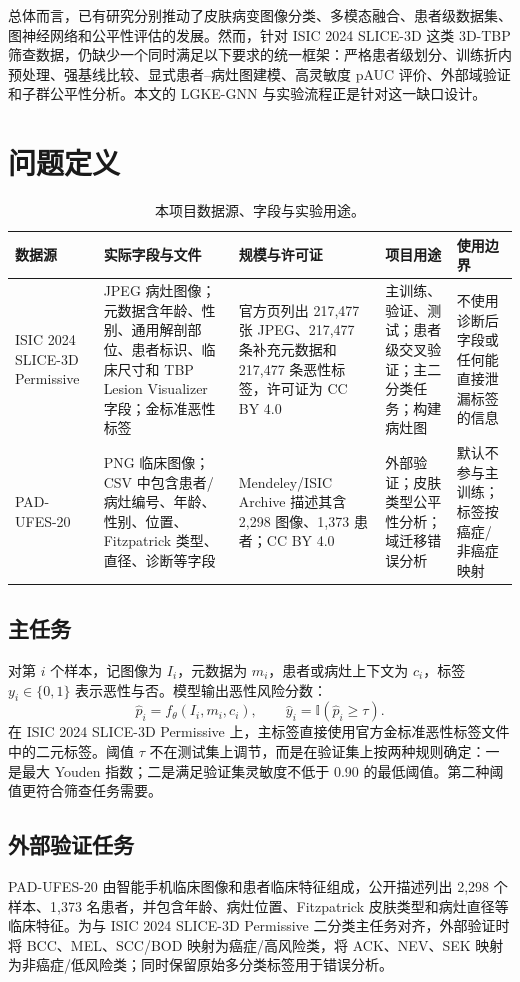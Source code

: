 \documentclass[UTF8,a4paper,10pt,twocolumn,fontset=fandol]{ctexart}
\newcommand{\isic}{ISIC 2024 SLICE-3D Permissive}
\newcommand{\pad}{PAD-UFES-20}
\begin{document}
总体而言，已有研究分别推动了皮肤病变图像分类、多模态融合、患者级数据集、图神经网络和公平性评估的发展。然而，针对 ISIC 2024 SLICE-3D 这类 3D-TBP 筛查数据，仍缺少一个同时满足以下要求的统一框架：严格患者级划分、训练折内预处理、强基线比较、显式患者--病灶图建模、高灵敏度 pAUC 评价、外部域验证和子群公平性分析。本文的 LGKE-GNN 与实验流程正是针对这一缺口设计。

\section{问题定义}
\begin{table}[t]
\centering
\small
\caption{本项目数据源、字段与实验用途。}
\label{tab:datasets}
\begin{tabularx}{\textwidth}{L{2.2cm}Y Y Y L{1.8cm}}
\toprule
数据源 & 实际字段与文件 & 规模与许可证 & 项目用途 & 使用边界 \\
\midrule
\isic{} & JPEG 病灶图像；元数据含年龄、性别、通用解剖部位、患者标识、临床尺寸和 TBP Lesion Visualizer 字段；金标准恶性标签 & 官方页列出 217,477 张 JPEG、217,477 条补充元数据和 217,477 条恶性标签，许可证为 CC BY 4.0\cite{isicdata2024} & 主训练、验证、测试；患者级交叉验证；主二分类任务；构建病灶图 & 不使用诊断后字段或任何能直接泄漏标签的信息 \\
\pad{} & PNG 临床图像；CSV 中包含患者/病灶编号、年龄、性别、位置、Fitzpatrick 类型、直径、诊断等字段 & Mendeley/ISIC Archive 描述其含 2,298 图像、1,373 患者；CC BY 4.0\cite{pacheco2020padufes20data,isicpadcollection} & 外部验证；皮肤类型公平性分析；域迁移错误分析 & 默认不参与主训练；标签按癌症/非癌症映射 \\
\bottomrule
\end{tabularx}
\end{table}
\subsection{主任务}
对第 $i$ 个样本，记图像为 $I_i$，元数据为 $m_i$，患者或病灶上下文为 $c_i$，标签 $y_i\in\{0,1\}$ 表示恶性与否。模型输出恶性风险分数：
\begin{equation}
    \hat{p}_i = f_{\theta}(I_i,m_i,c_i), \qquad
    \hat{y}_i = \mathbb{I}(\hat{p}_i \geq \tau).
\end{equation}
在 \isic{} 上，主标签直接使用官方金标准恶性标签文件中的二元标签。阈值 $\tau$ 不在测试集上调节，而是在验证集上按两种规则确定：一是最大 Youden 指数；二是满足验证集灵敏度不低于 0.90 的最低阈值。第二种阈值更符合筛查任务需要。

\subsection{外部验证任务}
\pad{} 由智能手机临床图像和患者临床特征组成，公开描述列出 2,298 个样本、1,373 名患者，并包含年龄、病灶位置、Fitzpatrick 皮肤类型和病灶直径等临床特征\cite{pacheco2020padufes20data,pacheco2020padufes20}。为与 \isic{} 二分类主任务对齐，外部验证时将 BCC、MEL、SCC/BOD 映射为癌症/高风险类，将 ACK、NEV、SEK 映射为非癌症/低风险类；同时保留原始多分类标签用于错误分析。
\end{document}
